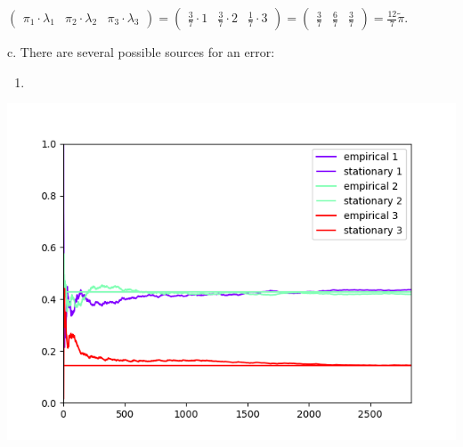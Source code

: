 \documentclass{article}
\begin{document}
$\begin{pmatrix}
    \pi_1\cdot\lambda_1 & \pi_2\cdot\lambda_2 & \pi_3\cdot\lambda_3
\end{pmatrix}=\begin{pmatrix}
    \frac{3}{7}\cdot{1} & \frac{3}{7}\cdot{2} & \frac{1}{7}\cdot{3}
\end{pmatrix}=\begin{pmatrix}
    \frac{3}{7} & \frac{6}{7} & \frac{3}{7}
\end{pmatrix}=\frac{12}{7}\tilde\pi$.

c. There are several possible sources for an error:
\begin{enumerate}
    \item 
\end{enumerate}
\includegraphics{ctmc1.png}
\end{document}
